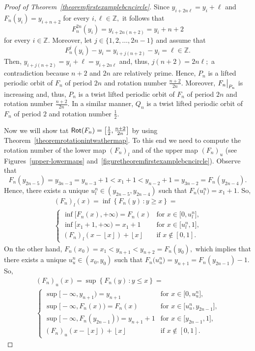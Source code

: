 \documentclass[a4paper, 11pt]{amsart}
\numberwithin{equation}{section}
\theoremstyle{customnumberedtheorem}
\theoremstyle{definitionwithbfnote}
\newcommand{\Z}{\ensuremath{\mathbb{Z}}}
\DeclareMathOperator{\Rot}{\textsf{\upshape Rot}}
\newcommand{\set}[2]{\ensuremath{\left\{#1 \,\colon #2\right\}}}
\newcommand{\floor}[1]{\ensuremath{\left\lfloor #1 \right\rfloor}}
\newcommand{\evalat}[1]{\bigr\rvert\sb{#1}}
\begin{document}
\begin{proof}[Proof of Theorem~\ref{theoremfirstexamplebcncircle}]
Since $y_{i + 2n\ell} = y_i + \ell$ and $F_n(y_i) = y_{i+n+2}$
for every $i,\ell \in \Z,$ it follows that
\[
 F^{2n}_n(y_i) = y_{i + 2n(n+2)} = y_i + n+2
\]
for every $i \in \Z.$
Moreover, let $j \in \{1,2,\dots, 2n-1\}$ and assume that
\[ F^j_n(y_i) - y_i = y_{i + j(n+2)} - y_i = \ell \in \Z. \]
Then, $y_{i + j(n+2)} = y_i + \ell = y_{i + 2n\ell}$ and, thus,
$j(n+2) = 2n\ell;$
a contradiction because $n+2$ and $2n$ are relatively prime.
Hence, $P_n$ is a lifted periodic orbit of $F_n$ of period $2n$
and rotation number $\tfrac{n+2}{2n}.$
Moreover, $F_n\evalat{P_n}$ is increasing and, thus,
$P_n$ is a twist lifted periodic orbit of $F_n$ of period $2n$
and rotation number $\tfrac{n+2}{2n}.$
In a similar manner, $Q_n$ is a twist lifted periodic orbit of $F_n$
of period $2$ and rotation number $\tfrac{1}{2}.$

Now we will show tat
$\Rot(F_n) = \left[\tfrac{1}{2}, \tfrac{n+2}{2n}\right]$
by using Theorem~\ref{theoremrotationintwathermap}.
To this end we need to compute the rotation number of the
lower map $(F_n)_l$ and of the upper map $(F_n)_u$
(see Figures~\ref{upper-lowermaps} and~\ref{figuretheoremfirstexamplebcncircle}).
Observe that
\[
F_n(y_{2n-5}) = y_{3n-3} = y_{n-3} + 1 < x_1 + 1 < y_{n-2} + 1 = y_{3n-2} = F_n(y_{2n-4}).
\]
Hence, there exists a unique $u^n_l \in (y_{2n-5}, y_{2n-4})$
such that $F_n\bigl(u^n_l\bigr) = x_1 + 1.$ So,\pagebreak[1]
\begin{multline*}
 (F_n)_l(x) = \inf\set{F_n(y)}{y \ge x} = \\
 \begin{cases}
    \inf\bigl[F_n(x), +\infty\bigr) = F_n(x)& \text{for $x \in \bigl[0, u^n_l\bigr]$,}\\
    \inf\bigl[x_1+1, +\infty\bigr) = x_1+1 & \text{for $x \in \bigl[u^n_l,1\bigr]$,}\\
    (F_n)_l(x - \floor{x}) + \floor{x} & \text{if $x \notin [0,1].$}
 \end{cases}
\end{multline*}
On the other hand,
$
F_n(x_0) = x_1 < y_{n+1} < y_{n+2} = F_n(y_0),
$
which implies that there exists a unique $u^n_u \in (x_0,y_0)$
such that $F_n\bigl(u^n_u\bigr) = y_{n+1} = F_n(y_{2n-1})-1.$ So,
\begin{multline*}
 (F_n)_u(x) = \sup\set{F_n(y)}{y \le x} = \\
 \begin{cases}
    \sup\bigl[-\infty, y_{n+1}\bigr) = y_{n+1} & \text{for $x \in \bigl[0, u^n_u\bigr]$,}\\
    \sup\bigl[-\infty, F_n(x)\bigr) = F_n(x)   & \text{for $x \in \bigl[u^n_u,y_{2n-1}\bigr]$,}\\
    \sup\bigl[-\infty, F_n(y_{2n-1})\bigr) = y_{n+1}+1 & \text{for $x \in \bigl[y_{2n-1}, 1\bigr]$,}\\
    (F_n)_u(x - \floor{x}) + \floor{x} & \text{if $x \notin [0,1].$}
 \end{cases}
\end{multline*}


\end{proof}
\end{document}
